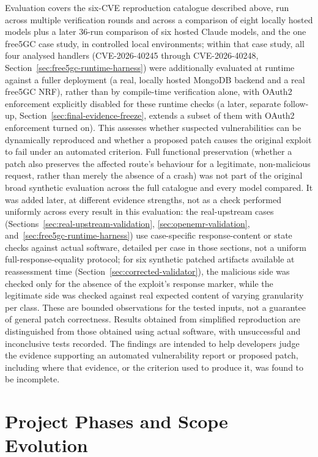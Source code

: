 \documentclass[12pt,a4paper]{report}
\begin{document}
Evaluation covers the six-CVE reproduction catalogue described above, run across multiple verification rounds and across a comparison of eight locally hosted models plus a later 36-run comparison of six hosted Claude models, and the one free5GC case study, in controlled local environments; within that case study, all four analysed handlers (CVE-2026-40245 through CVE-2026-40248, Section~\ref{sec:free5gc-runtime-harness}) were additionally evaluated at runtime against a fuller deployment (a real, locally hosted MongoDB backend and a real free5GC NRF), rather than by compile-time verification alone, with OAuth2 enforcement explicitly disabled for these runtime checks (a later, separate follow-up, Section~\ref{sec:final-evidence-freeze}, extends a subset of them with OAuth2 enforcement turned on). This assesses whether suspected vulnerabilities can be dynamically reproduced and whether a proposed patch causes the original exploit to fail under an automated criterion. Full functional preservation (whether a patch also preserves the affected route's behaviour for a legitimate, non-malicious request, rather than merely the absence of a crash) was not part of the original broad synthetic evaluation across the full catalogue and every model compared. It was added later, at different evidence strengths, not as a check performed uniformly across every result in this evaluation: the real-upstream cases (Sections~\ref{sec:real-upstream-validation}, \ref{sec:openemr-validation}, and~\ref{sec:free5gc-runtime-harness}) use case-specific response-content or state checks against actual software, detailed per case in those sections, not a uniform full-response-equality protocol; for six synthetic patched artifacts available at reassessment time (Section~\ref{sec:corrected-validator}), the malicious side was checked only for the absence of the exploit's response marker, while the legitimate side was checked against real expected content of varying granularity per class. These are bounded observations for the tested inputs, not a guarantee of general patch correctness. Results obtained from simplified reproduction are distinguished from those obtained using actual software, with unsuccessful and inconclusive tests recorded. The findings are intended to help developers judge the evidence supporting an automated vulnerability report or proposed patch, including where that evidence, or the criterion used to produce it, was found to be incomplete.

\section{Project Phases and Scope Evolution}
\end{document}
